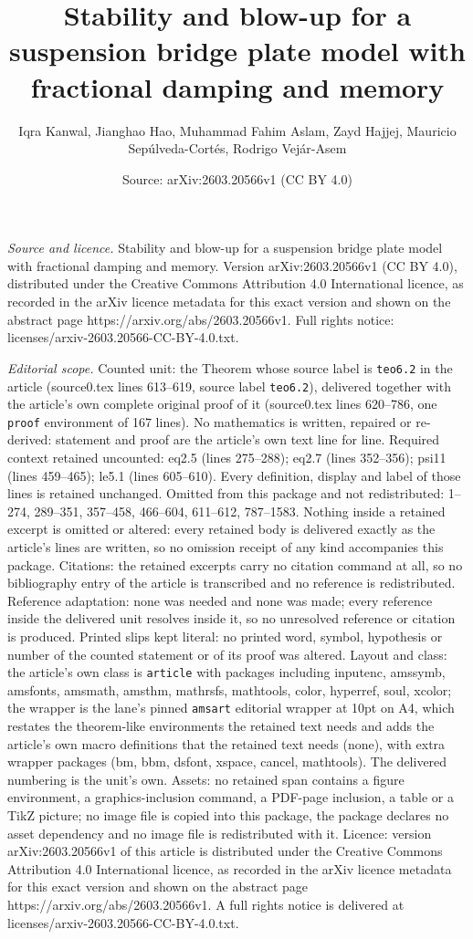 \documentclass[10pt,a4paper]{amsart}
\title[Stability and blow-up for a suspension bridge plate model wi]{Stability and blow-up for a suspension bridge plate model with fractional damping and memory}
\author{Iqra Kanwal, Jianghao Hao, Muhammad Fahim Aslam, Zayd Hajjej, Mauricio Sep\'ulveda-Cort\'es, Rodrigo Vej\'ar-Asem}
\date{Source: arXiv:2603.20566v1 (CC BY 4.0)}
\begin{document}
\maketitle

\noindent\emph{Source and licence.} Stability and blow-up for a suspension bridge plate model with fractional damping and memory. Version arXiv:2603.20566v1 (CC BY 4.0), distributed under the Creative Commons Attribution 4.0 International licence, as recorded in the arXiv licence metadata for this exact version and shown on the abstract page https://arxiv.org/abs/2603.20566v1. Full rights notice: licenses/arxiv-2603.20566-CC-BY-4.0.txt.\par\smallskip

\noindent\textit{Editorial scope.} Counted unit: the Theorem whose source label is \texttt{teo6.2} in the article (source0.tex lines 613--619, source label \texttt{teo6.2}), delivered together with the article's own complete original proof of it (source0.tex lines 620--786, one \texttt{proof} environment of 167 lines). No mathematics is written, repaired or re-derived: statement and proof are the article's own text line for line. Required context retained uncounted: eq2.5 (lines 275--288); eq2.7 (lines 352--356); psi11 (lines 459--465); le5.1 (lines 605--610). Every definition, display and label of those lines is retained unchanged. Omitted from this package and not redistributed: 1--274, 289--351, 357--458, 466--604, 611--612, 787--1583. Nothing inside a retained excerpt is omitted or altered: every retained body is delivered exactly as the article's lines are written, so no omission receipt of any kind accompanies this package. Citations: the retained excerpts carry no citation command at all, so no bibliography entry of the article is transcribed and no reference is redistributed. Reference adaptation: none was needed and none was made; every reference inside the delivered unit resolves inside it, so no unresolved reference or citation is produced. Printed slips kept literal: no printed word, symbol, hypothesis or number of the counted statement or of its proof was altered. Layout and class: the article's own class is \texttt{article} with packages including inputenc, amssymb, amsfonts, amsmath, amsthm, mathrsfs, mathtools, color, hyperref, soul, xcolor; the wrapper is the lane's pinned \texttt{amsart} editorial wrapper at 10pt on A4, which restates the theorem-like environments the retained text needs and adds the article's own macro definitions that the retained text needs (none), with extra wrapper packages (bm, bbm, dsfont, xspace, cancel, mathtools). The delivered numbering is the unit's own. Assets: no retained span contains a figure environment, a graphics-inclusion command, a PDF-page inclusion, a table or a TikZ picture; no image file is copied into this package, the package declares no asset dependency and no image file is redistributed with it. Licence: version arXiv:2603.20566v1 of this article is distributed under the Creative Commons Attribution 4.0 International licence, as recorded in the arXiv licence metadata for this exact version and shown on the abstract page https://arxiv.org/abs/2603.20566v1. A full rights notice is delivered at licenses/arxiv-2603.20566-CC-BY-4.0.txt. 
\end{document}
